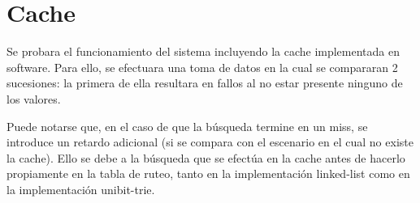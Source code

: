\newpage
\section{Cache}

Se probara el funcionamiento del sistema incluyendo la cache implementada en software. Para ello, se efectuara una toma de datos en la cual se compararan 2 sucesiones: la primera de ella resultara en fallos al no estar presente ninguno de los valores.

Puede notarse que, en el caso de que la búsqueda termine en un miss, se introduce un retardo adicional (si se compara con el escenario en el cual no existe la cache). Ello se debe a la búsqueda que se efectúa en la cache antes de hacerlo propiamente en la tabla de ruteo, tanto en la implementación linked-list como en la implementación unibit-trie.


